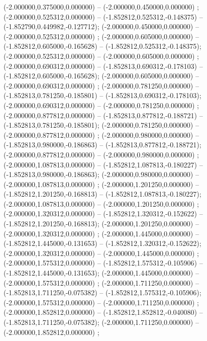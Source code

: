  (-2.000000,0.375000,0.000000) -- (-2.000000,0.450000,0.000000) ;
 (-2.000000,0.525312,0.000000) -- (-1.852812,0.525312,-0.148375) -- (-1.852790,0.449982,-0.127712);
 (-2.000000,0.450000,0.000000) -- (-2.000000,0.525312,0.000000) ;
 (-2.000000,0.605000,0.000000) -- (-1.852812,0.605000,-0.165628) -- (-1.852812,0.525312,-0.148375);
 (-2.000000,0.525312,0.000000) -- (-2.000000,0.605000,0.000000) ;
 (-2.000000,0.690312,0.000000) -- (-1.852813,0.690312,-0.178103) -- (-1.852812,0.605000,-0.165628);
 (-2.000000,0.605000,0.000000) -- (-2.000000,0.690312,0.000000) ;
 (-2.000000,0.781250,0.000000) -- (-1.852813,0.781250,-0.185801) -- (-1.852813,0.690312,-0.178103);
 (-2.000000,0.690312,0.000000) -- (-2.000000,0.781250,0.000000) ;
 (-2.000000,0.877812,0.000000) -- (-1.852813,0.877812,-0.188721) -- (-1.852813,0.781250,-0.185801);
 (-2.000000,0.781250,0.000000) -- (-2.000000,0.877812,0.000000) ;
 (-2.000000,0.980000,0.000000) -- (-1.852813,0.980000,-0.186863) -- (-1.852813,0.877812,-0.188721);
 (-2.000000,0.877812,0.000000) -- (-2.000000,0.980000,0.000000) ;
 (-2.000000,1.087813,0.000000) -- (-1.852812,1.087813,-0.180227) -- (-1.852813,0.980000,-0.186863);
 (-2.000000,0.980000,0.000000) -- (-2.000000,1.087813,0.000000) ;
 (-2.000000,1.201250,0.000000) -- (-1.852812,1.201250,-0.168813) -- (-1.852812,1.087813,-0.180227);
 (-2.000000,1.087813,0.000000) -- (-2.000000,1.201250,0.000000) ;
 (-2.000000,1.320312,0.000000) -- (-1.852812,1.320312,-0.152622) -- (-1.852812,1.201250,-0.168813);
 (-2.000000,1.201250,0.000000) -- (-2.000000,1.320312,0.000000) ;
 (-2.000000,1.445000,0.000000) -- (-1.852812,1.445000,-0.131653) -- (-1.852812,1.320312,-0.152622);
 (-2.000000,1.320312,0.000000) -- (-2.000000,1.445000,0.000000) ;
 (-2.000000,1.575312,0.000000) -- (-1.852812,1.575312,-0.105906) -- (-1.852812,1.445000,-0.131653);
 (-2.000000,1.445000,0.000000) -- (-2.000000,1.575312,0.000000) ;
 (-2.000000,1.711250,0.000000) -- (-1.852813,1.711250,-0.075382) -- (-1.852812,1.575312,-0.105906);
 (-2.000000,1.575312,0.000000) -- (-2.000000,1.711250,0.000000) ;
 (-2.000000,1.852812,0.000000) -- (-1.852812,1.852812,-0.040080) -- (-1.852813,1.711250,-0.075382);
 (-2.000000,1.711250,0.000000) -- (-2.000000,1.852812,0.000000) ;
